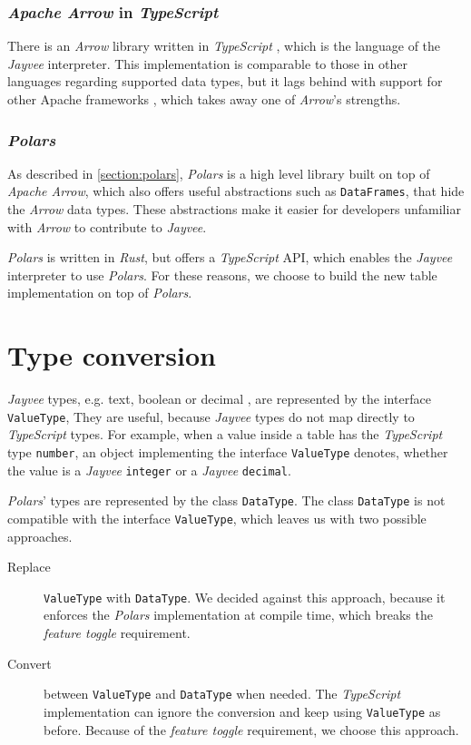 \subsubsection{\emph{Apache Arrow} in \emph{TypeScript}}
\label{subsubsection:arrow_in_js}
There is an \emph{Arrow} library written in \emph{TypeScript} \autocite{arrow:overview}, which is the language of the \emph{Jayvee} interpreter.
This implementation is comparable to those in other languages regarding supported data types, but it lags behind with support for other Apache frameworks \autocite{arrow:status}, which takes away one of \emph{Arrow}'s strengths.

\subsubsection{\emph{Polars}}
As described in \autoref{section:polars}, \emph{Polars} is a high level library built on top of \emph{Apache Arrow}, which also offers useful abstractions such as \Verb|DataFrames|, that hide the \emph{Arrow} data types.
These abstractions make it easier for developers unfamiliar with \emph{Arrow} to contribute to \emph{Jayvee}.

\emph{Polars} is written in \emph{Rust}, but offers a \emph{TypeScript} \ac{API}, which enables the \emph{Jayvee} interpreter to use \emph{Polars}.
For these reasons, we choose to build the new table implementation on top of \emph{Polars}.



\section{Type conversion}
\label{section:type_conversion}
\emph{Jayvee} types, e.g. text, boolean or decimal \autocite{jvalue:jayvee:docs:core_concepts}, are represented by the interface \Verb|ValueType|,
They are useful, because \emph{Jayvee} types do not map directly to \emph{TypeScript} types.
For example, when a value inside a table has the \emph{TypeScript} type \Verb|number|, an object implementing the interface \Verb|ValueType| denotes, whether the value is a \emph{Jayvee} \Verb|integer| or a \emph{Jayvee} \Verb|decimal|.

\emph{Polars}' types are represented by the class \Verb|DataType|.
The class \Verb|DataType| is not compatible with the interface \Verb|ValueType|, which leaves us with two possible approaches.
\begin{description}
	\item[Replace] \Verb|ValueType| with \Verb|DataType|.
	      We decided against this approach, because it enforces the \emph{Polars} implementation at compile time, which breaks the \emph{feature toggle} requirement.
	\item[Convert] between \Verb|ValueType| and \Verb|DataType| when needed.
	      The \emph{TypeScript} implementation can ignore the conversion and keep using \Verb|ValueType| as before.
	      Because of the \emph{feature toggle} requirement, we choose this approach.
\end{description}



